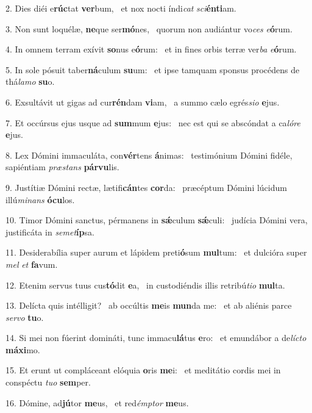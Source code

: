 2. Dies diéi e\textbf{rúc}tat \textbf{ver}bum, \ast\  et nox nocti índi\textit{cat} \textit{sci}\textbf{én}\textbf{ti}am.\

3. Non sunt loquélæ, \textbf{ne}que ser\textbf{mó}nes, \ast\  quorum non audiántur vo\textit{ces} \textit{e}\textbf{ó}rum.\

4. In omnem terram exívit \textbf{so}nus e\textbf{ó}rum: \ast\  et in fines orbis terræ ver\textit{ba} \textit{e}\textbf{ó}rum.\

5. In sole pósuit taber\textbf{ná}culum \textbf{su}um: \ast\  et ipse tamquam sponsus procédens de thá\textit{la}\textit{mo} \textbf{su}o.\

6. Exsultávit ut gigas ad cur\textbf{rén}dam \textbf{vi}am, \ast\  a summo cælo egrés\textit{si}\textit{o} \textbf{e}jus.\

7. Et occúrsus ejus usque ad \textbf{sum}mum \textbf{e}jus: \ast\  nec est qui se abscóndat a ca\textit{ló}\textit{re} \textbf{e}jus.\

8. Lex Dómini immaculáta, con\textbf{vér}tens \textbf{á}nimas: \ast\  testimónium Dómini fidéle, sapiéntiam \textit{præ}\textit{stans} \textbf{pár}\textbf{vu}lis.\

9. Justítiæ Dómini rectæ, lætifi\textbf{cán}tes \textbf{cor}da: \ast\  præcéptum Dómini lúcidum illú\textit{mi}\textit{nans} \textbf{ó}\textbf{cu}los.\

10. Timor Dómini sanctus, pérmanens in \textbf{sǽ}culum \textbf{sǽ}culi: \ast\  judícia Dómini vera, justificáta in \textit{se}\textit{met}\textbf{íp}sa.\

11. Desiderabília super aurum et lápidem preti\textbf{ó}sum \textbf{mul}tum: \ast\  et dulcióra super \textit{mel} \textit{et} \textbf{fa}vum.\

12. Etenim servus tuus cus\textbf{tó}dit \textbf{e}a, \ast\  in custodiéndis illis retribú\textit{ti}\textit{o} \textbf{mul}ta.\

13. Delícta quis intélligit? \dag\  ab occúltis \textbf{me}is \textbf{mun}da me: \ast\  et ab aliénis parce \textit{ser}\textit{vo} \textbf{tu}o.\

14. Si mei non fúerint domináti, tunc immacu\textbf{lá}tus \textbf{e}ro: \ast\  et emundábor a de\textit{líc}\textit{to} \textbf{má}\textbf{xi}mo.\

15. Et erunt ut compláceant elóquia \textbf{o}ris \textbf{me}i: \ast\  et meditátio cordis mei in conspéctu \textit{tu}\textit{o} \textbf{sem}per.\

16. Dómine, ad\textbf{jú}tor \textbf{me}us, \ast\  et red\textit{émp}\textit{tor} \textbf{me}us.\

